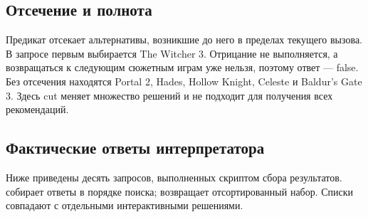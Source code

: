 \subsection{Отсечение и полнота}
Предикат \code{!} отсекает альтернативы, возникшие до него в пределах текущего вызова.
В запросе 
первым выбирается The Witcher 3. Отрицание не выполняется, а возвращаться к
следующим сюжетным играм уже нельзя, поэтому ответ --- false.
Без отсечения находятся Portal 2, Hades, Hollow Knight, Celeste и Baldur's Gate 3.
Здесь cut меняет множество решений и не подходит для получения всех рекомендаций.

\subsection{Фактические ответы интерпретатора}
Ниже приведены десять запросов, выполненных скриптом сбора результатов.
 собирает ответы в порядке поиска;  возвращает
отсортированный набор. Списки совпадают с отдельными интерактивными решениями.
\par\medskip

